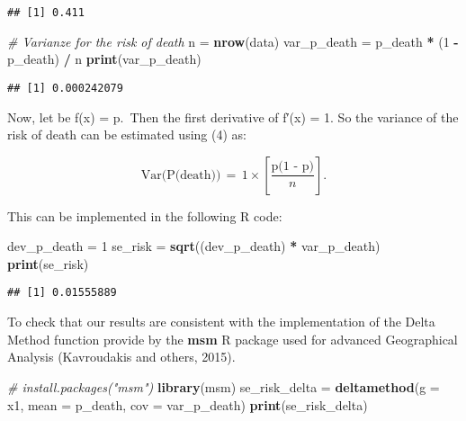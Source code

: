 \documentclass[
]{article}
\newenvironment{Shaded}{\begin{snugshade}}{\end{snugshade}}
\newcommand{\CommentTok}[1]{\textcolor[rgb]{0.56,0.35,0.01}{\textit{#1}}}
\newcommand{\DataTypeTok}[1]{\textcolor[rgb]{0.13,0.29,0.53}{#1}}
\newcommand{\DecValTok}[1]{\textcolor[rgb]{0.00,0.00,0.81}{#1}}
\newcommand{\KeywordTok}[1]{\textcolor[rgb]{0.13,0.29,0.53}{\textbf{#1}}}
\newcommand{\NormalTok}[1]{#1}
\newcommand{\OperatorTok}[1]{\textcolor[rgb]{0.81,0.36,0.00}{\textbf{#1}}}
\newcommand{\StringTok}[1]{\textcolor[rgb]{0.31,0.60,0.02}{#1}}
\begin{document}
\begin{verbatim}
## [1] 0.411
\end{verbatim}

\begin{Shaded}
\begin{Highlighting}[]
\CommentTok{# Varianze for the risk of death}
\NormalTok{ n =}\StringTok{ }\KeywordTok{nrow}\NormalTok{(data)}
\NormalTok{ var_p_death =}\StringTok{ }\NormalTok{p_death }\OperatorTok{*}\StringTok{ }\NormalTok{(}\DecValTok{1} \OperatorTok{-}\StringTok{ }\NormalTok{p_death) }\OperatorTok{/}\StringTok{ }\NormalTok{n}
 \KeywordTok{print}\NormalTok{(var_p_death)}
\end{Highlighting}
\end{Shaded}

\begin{verbatim}
## [1] 0.000242079
\end{verbatim}

Now, let be f(x) = p.~Then the first derivative of f′(x) = 1. So the
variance of the risk of death can be estimated using (4) as:

\[\text{Var(P(death))}\,=\,1\times\left[\frac{\text{p(1 - p)}}{n}\right].\]

This can be implemented in the following R code:

\begin{Shaded}
\begin{Highlighting}[]
\NormalTok{dev_p_death =}\StringTok{ }\DecValTok{1}
\NormalTok{se_risk =}\StringTok{ }\KeywordTok{sqrt}\NormalTok{((dev_p_death) }\OperatorTok{*}\StringTok{ }\NormalTok{var_p_death)}
\KeywordTok{print}\NormalTok{(se_risk)}
\end{Highlighting}
\end{Shaded}

\begin{verbatim}
## [1] 0.01555889
\end{verbatim}

To check that our results are consistent with the implementation of the
Delta Method function provide by the \textbf{msm} R package used for
advanced Geographical Analysis (Kavroudakis and others, 2015).

\begin{Shaded}
\begin{Highlighting}[]
\CommentTok{# install.packages("msm")}
\KeywordTok{library}\NormalTok{(msm)}
\NormalTok{se_risk_delta =}\StringTok{ }\KeywordTok{deltamethod}\NormalTok{(}\DataTypeTok{g =} \OperatorTok{~}\StringTok{ }\NormalTok{x1, }
                            \DataTypeTok{mean =}\NormalTok{ p_death,         }
                            \DataTypeTok{cov  =}\NormalTok{ var_p_death)}
\KeywordTok{print}\NormalTok{(se_risk_delta)}
\end{Highlighting}
\end{Shaded}
\end{document}
